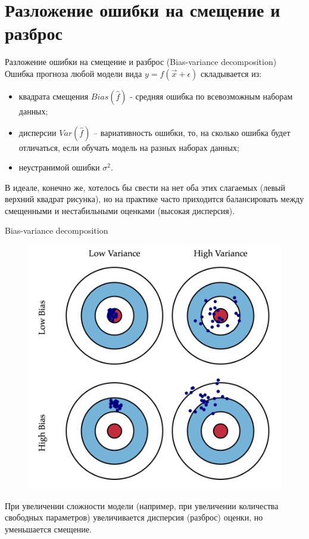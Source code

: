 \documentclass{beamer}
\begin{document}
\section{Разложение ошибки на смещение и разброс}

\begin{frame}[fragile]{Разложение ошибки на смещение и разброс (Bias-variance decomposition)}
Ошибка прогноза любой модели вида $y=f(\vec{x}+\epsilon)$ складывается из:
\begin{itemize}
\item квадрата смещения $Bias(\hat{f})$ - средняя ошибка по всевозможным наборам данных;
\item дисперсии $Var(\hat{f})$ – вариативность ошибки, то, на сколько ошибка будет отличаться, если обучать модель на разных наборах данных;
\item неустранимой ошибки $\sigma^2$.
\end{itemize}
В идеале, конечно же, хотелось бы свести на нет оба этих слагаемых (левый верхний квадрат рисунка), но на практике часто приходится балансировать между смещенными и нестабильными оценками (высокая дисперсия).
\end{frame}

\begin{frame}[fragile]{Bias-variance decomposition}
\begin{figure}[h]
\centering
\includegraphics[scale=0.2]{images/bias-variant.png}
\end{figure}
При увеличении сложности модели (например, при увеличении количества свободных параметров) увеличивается дисперсия (разброс) оценки, но уменьшается смещение.
\end{frame}
\end{document}
